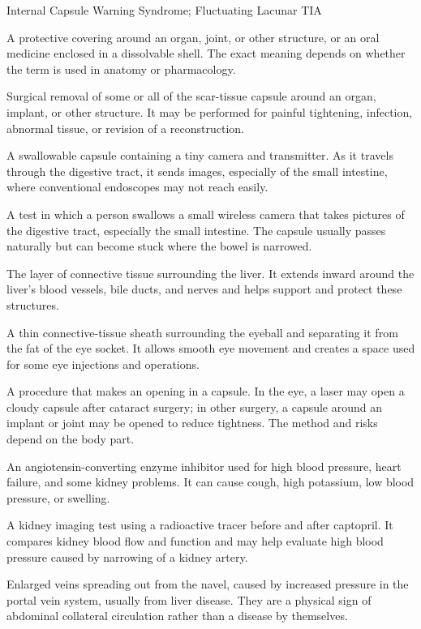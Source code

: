\synonyms
Internal Capsule Warning Syndrome; Fluctuating Lacunar TIA

 A protective covering around an organ, joint, or other structure, or an oral medicine enclosed in a dissolvable shell. The exact meaning depends on whether the term is used in anatomy or pharmacology.

 Surgical removal of some or all of the scar-tissue capsule around an organ, implant, or other structure. It may be performed for painful tightening, infection, abnormal tissue, or revision of a reconstruction.

 A swallowable capsule containing a tiny camera and transmitter. As it travels through the digestive tract, it sends images, especially of the small intestine, where conventional endoscopes may not reach easily.

 A test in which a person swallows a small wireless camera that takes pictures of the digestive tract, especially the small intestine. The capsule usually passes naturally but can become stuck where the bowel is narrowed.

 The layer of connective tissue surrounding the liver. It extends inward around the liver's blood vessels, bile ducts, and nerves and helps support and protect these structures.

 A thin connective-tissue sheath surrounding the eyeball and separating it from the fat of the eye socket. It allows smooth eye movement and creates a space used for some eye injections and operations.

 A procedure that makes an opening in a capsule. In the eye, a laser may open a cloudy capsule after cataract surgery; in other surgery, a capsule around an implant or joint may be opened to reduce tightness. The method and risks depend on the body part.

 An angiotensin-converting enzyme inhibitor used for high blood pressure, heart failure, and some kidney problems. It can cause cough, high potassium, low blood pressure, or swelling.

 A kidney imaging test using a radioactive tracer before and after captopril. It compares kidney blood flow and function and may help evaluate high blood pressure caused by narrowing of a kidney artery.

 Enlarged veins spreading out from the navel, caused by increased pressure in the portal vein system, usually from liver disease. They are a physical sign of abdominal collateral circulation rather than a disease by themselves.

